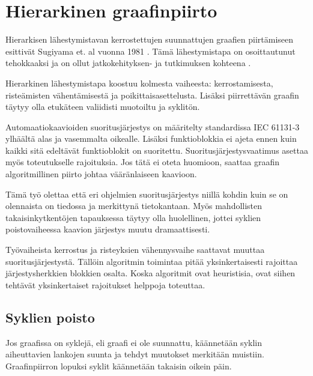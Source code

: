\documentclass[finnish,12pt]{article}
\begin{document}

	\clearpage
	\section{Hierarkinen graafinpiirto}

Hierarkisen lähestymistavan kerrostettujen suunnattujen graafien piirtämiseen
esittivät Sugiyama et. al vuonna 1981 \cite{RefWorks:9}. Tämä lähestymistapa on
osoittautunut tehokkaaksi ja on ollut jatkokehityksen- ja tutkimuksen kohteena
\cite{RefWorks:28}.

Hierarkinen lähestymistapa koostuu kolmesta vaiheesta: kerrostamisesta,
risteämisten vähentämisestä ja poikittaisasettelusta. Lisäksi piirrettävän
graafin täytyy olla etukäteen valiidisti muotoiltu ja syklitön.

Automaatiokaavioiden suoritusjärjestys on määritelty standardissa IEC 61131-3
ylhäältä alas ja vasemmalta oikealle. Lisäksi funktioblokkia ei ajeta ennen
kuin kaikki sitä edeltävät funktioblokit on suoritettu.
Suoritusjärjestysvaatimus asettaa myös toteutukselle rajoituksia. Jos tätä ei oteta
huomioon, saattaa graafin algoritmillinen piirto johtaa vääränlaiseen kaavioon.

Tämä työ olettaa että eri ohjelmien suoritusjärjestys niillä kohdin kuin se on
olennaista on tiedossa ja merkittynä tietokantaan.
Myös mahdollisten takaisinkytkentöjen tapauksessa täytyy olla huolellinen, jottei syklien poistovaiheessa kaavion järjestys muutu dramaattisesti.

Työvaiheista kerrostus ja risteyksien vähennysvaihe saattavat muuttaa suoritusjärjestystä. Tällöin algoritmin toimintaa pitää yksinkertaisesti rajoittaa järjestysherkkien blokkien osalta. Koska algoritmit ovat heuristisia, ovat siihen tehtävät yksinkertaiset rajoitukset helppoja toteuttaa.

		\subsection{Syklien poisto}

Jos graafissa on syklejä, eli graafi ei ole suunnattu, käännetään syklin
aiheuttavien lankojen suunta ja tehdyt muutokset merkitään muistiin.
Graafinpiirron lopuksi syklit käännetään takaisin oikein päin.
\end{document}
